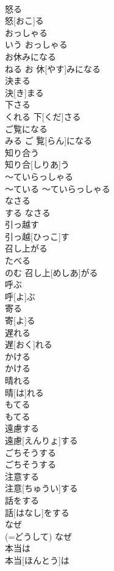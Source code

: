 \documentclass[8pt]{extreport}
\begin{document}
\begin{CJK}{UTF8}{min}
\\	怒る	
\\	怒[おこ]る
\\	おっしゃる	
\\	いう	おっしゃる
\\	お休みになる	
\\	ねる	お 休[やす]みになる
\\	決まる	
\\	決[き]まる
\\	下さる	
\\	くれる	下[くだ]さる
\\	ご覧になる	
\\	みる	ご 覧[らん]になる
\\	知り合う	
\\	知り合[しりあ]う
\\	〜ていらっしゃる	
\\	〜ている	〜ていらっしゃる
\\	なさる	
\\	する	なさる
\\	引っ越す	
\\	引っ越[ひっこ]す
\\	召し上がる	
\\	たべる 
\\	のむ	召し上[めしあ]がる
\\	呼ぶ	
\\	呼[よ]ぶ
\\	寄る	
\\	寄[よ]る
\\	遅れる	
\\	遅[おく]れる
\\	かける	
\\	かける
\\	晴れる	
\\	晴[は]れる
\\	もてる	
\\	もてる
\\	遠慮する	
\\	遠慮[えんりょ]する
\\	ごちそうする	
\\	ごちそうする
\\	注意する	
\\	注意[ちゅうい]する
\\	話をする	
\\	話[はなし]をする
\\	なぜ	
\\	(=どうして)	なぜ
\\	本当は	
\\	本当[ほんとう]は

\end{CJK}
\end{document}

